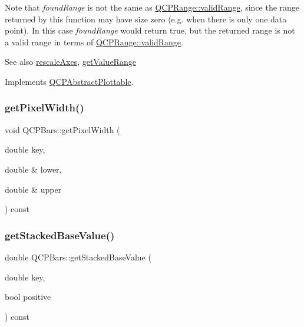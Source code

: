 Note that {\itshape found\+Range} is not the same as \mbox{\hyperlink{class_q_c_p_range_ab38bd4841c77c7bb86c9eea0f142dcc0}{Q\+C\+P\+Range\+::valid\+Range}}, since the range returned by this function may have size zero (e.\+g. when there is only one data point). In this case {\itshape found\+Range} would return true, but the returned range is not a valid range in terms of \mbox{\hyperlink{class_q_c_p_range_ab38bd4841c77c7bb86c9eea0f142dcc0}{Q\+C\+P\+Range\+::valid\+Range}}.

\begin{DoxySeeAlso}{See also}
\mbox{\hyperlink{class_q_c_p_abstract_plottable_a1491c4a606bccd2d09e65e11b79eb882}{rescale\+Axes}}, \mbox{\hyperlink{class_q_c_p_bars_a02cee4bf94d48a1e5f6fc185d9a10477}{get\+Value\+Range}} 
\end{DoxySeeAlso}


Implements \mbox{\hyperlink{class_q_c_p_abstract_plottable_a4da16d3cd4b509e1104a9b0275623c96}{Q\+C\+P\+Abstract\+Plottable}}.

\mbox{\label{class_q_c_p_bars_ad87586cc5e9806740bc0e867667da409}} 
\subsubsection{\texorpdfstring{getPixelWidth()}{getPixelWidth()}}
{\footnotesize\ttfamily void Q\+C\+P\+Bars\+::get\+Pixel\+Width (\begin{DoxyParamCaption}\item[{double}]{key,  }\item[{double \&}]{lower,  }\item[{double \&}]{upper }\end{DoxyParamCaption}) const\hspace{0.3cm}{\ttfamily [protected]}}

\mbox{\label{class_q_c_p_bars_a0ffd6e043876e13e89eaa54e9f8a04b9}} 
\subsubsection{\texorpdfstring{getStackedBaseValue()}{getStackedBaseValue()}}
{\footnotesize\ttfamily double Q\+C\+P\+Bars\+::get\+Stacked\+Base\+Value (\begin{DoxyParamCaption}\item[{double}]{key,  }\item[{bool}]{positive }\end{DoxyParamCaption}) const\hspace{0.3cm}{\ttfamily [protected]}}

